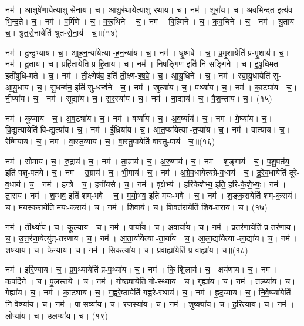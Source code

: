 नम॑। आ॒शुषे॑णा॒येत्या॒शु-से॒ना॒य॒। च॒। आ॒शु॒र॑था॒येत्या॒शु-र॒था॒य॒। च॒। 
नम॑। शूरा॑य। च॒। अ॒व॒भि॒न्द॒त इत्य॑व-भि॒न्द॒ते। च॒। 
नम॑। व॒र्मिणे। च॒। व॒रू॒थिने। च॒। 
नम॑। बि॒ल्मिने। च॒। क॒व॒चिने। च॒। 
नम॑। श्रु॒ताय॑। च॒। श्रु॒त॒से॒नायेति॑ श्रुत-से॒ना॒य॑। च॒॥(१४)


नम॑। दु॒न्दु॒भ्या॑य। च॒। आ॒ह॒न॒न्या॑येत्या-ह॒न॒न्या॑य। च॒। 
नम॑। धृ॒ष्णवे। च॒। प्र॒मृ॒शायेति॑ प्र-मृ॒शाय॑। च॒। 
नम॑। दू॒ताय॑। च॒। प्रहि॑ता॒येति॒ प्र-हि॒ता॒य॒। च॒। 
नम॑। नि॒ष॒ङ्गिण॒ इति॑ नि-स॒ङ्गिने। च॒। इ॒षु॒धि॒मत॒ इती॑षुधि-मते। च॒। 
नम॑। ती॒क्ष्णेष॑व॒ इति॑ ती॒क्ष्ण-इ॒ष॒वे॒। च॒। आ॒यु॒धिने। च॒। 
नम॑। स्वा॒यु॒धायेति॑ सु-आ॒यु॒धाय॑। च॒। सु॒धन्व॑न॒ इति॑ सु-धन्व॑ने। च॒। 
नम॑। स्रुत्या॑य। च॒। पथ्या॑य। च॒। 
नम॑। का॒ट्या॑य। च॒। नी॒प्या॑य। च॒। 
नम॑। सूद्या॑य। च॒। स॒र॒स्या॑य। च॒। 
नम॑। ना॒द्याय॑। च॒। वै॒श॒न्ताय॑। च॒। (१५)


नम॑। कूप्या॑य। च॒। अ॒व॒ट्या॑य। च॒। 
नम॑। वर्ष्या॑य। च॒। अ॒व॒र्ष्याय॑। च॒। 
नम॑। मे॒घ्या॑य। च॒। वि॒द्यु॒त्या॑येति॑ वि-द्यु॒त्या॑य। च॒। 
नम॑। ई॒ध्रिया॑य। च॒। आ॒त॒प्या॑येत्या-त॒प्या॑य। च॒। 
नम॑। वात्या॑य। च॒। रेष्मि॑याय। च॒। 
नम॑। वा॒स्त॒व्या॑य। च॒। वा॒स्तु॒पायेति॑ वास्तु-पाय॑। च॒॥(१६)


नम॑। सोमा॑य। च॒। रु॒द्राय॑। च॒। 
नम॑। ता॒म्राय॑। च॒। अ॒रु॒णाय॑। च॒। 
नम॑। श॒ङ्गाय॑। च॒। प॒शु॒पत॑य॒ इति॑ पशु-पत॑ये। च॒। 
नम॑। उ॒ग्राय॑। च॒। भी॒माय॑। च॒। 
नम॑। अ॒ग्रे॒व॒धायेत्य॑ग्रे-व॒धाय॑। च॒। दू॒रे॒व॒धायेति॑ दूरे-व॒धाय॑। च॒। 
नम॑। ह॒न्त्रे। च॒। हनी॑यसे। च॒। 
नम॑। वृ॒क्षेभ्य॑। हरि॑केशेभ्य॒ इति॒ हरि॑-के॒शे॒भ्यः॒। 
नम॑। ता॒राय॑। नम॑। श॒म्भव॒ इति॑ शम्-भवे। च॒। म॒यो॒भव॒ इति॑ मयः-भवे। च॒। 
नम॑। श॒ङ्क॒रायेति॑ शम्-क॒राय॑। च॒। म॒य॒स्क॒रायेति॑ मयः-क॒राय॑। च॒। 
नम॑। शि॒वाय॑। च॒। शि॒वत॑रा॒येति॑ शि॒व-त॒रा॒य॒। च॒। (१७)


नम॑। तीर्थ्या॑य। च॒। कूल्या॑य। च॒। 
नम॑। पा॒र्या॑य। च॒। अ॒वा॒र्या॑य। च॒। 
नम॑। प्र॒तर॑णा॒येति॑ प्र-तर॑णाय। च॒। उ॒त्त॒र॑णा॒येत्यु॑त्-तर॑णाय। च॒। 
नम॑। आ॒ता॒र्या॑येत्या-ता॒र्या॑य। च॒। आ॒ला॒द्या॑येत्या-ला॒द्या॑य। च॒। 
नम॑। शष्प्या॑य। च॒। फेन्या॑य। च॒। 
नम॑। सि॒क॒त्या॑य। च॒। प्र॒वा॒ह्या॑येति॑ प्र-वा॒ह्या॑य। च॒॥(१८)


नम॑। इ॒रि॒ण्या॑य। च॒। प्र॒प॒थ्या॑येति॑ प्र-प॒थ्या॑य। च॒। 
नम॑। कि॒शि॒लाय॑। च॒। क्षय॑णाय। च॒। 
नम॑। क॒प॒र्दिने। च॒। पु॒ल॒स्तये। च॒। 
नम॑। गोष्ठ्या॒येति॒ गो-स्थ्या॒य॒। च॒। गृह्या॑य। च॒। 
नम॑। तल्प्या॑य। च॒। गेह्या॑य। च॒। 
नम॑। का॒ट्या॑य। च॒। ग॒ह्व॒रे॒ष्ठायेति॑ गह्वरे-स्थाय॑। च॒। 
नम॑। ह्र॒द॒य्या॑य। च॒। नि॒वे॒ष्प्या॑येति॑ नि-वेष्प्या॑य। च॒। 
नम॑। पा॒स॒व्या॑य। च॒। र॒ज॒स्या॑य। च॒। 
नम॑। शुष्क्या॑य। च॒। ह॒रि॒त्या॑य। च॒। 
नम॑। लोप्या॑य। च॒। उ॒ल॒प्या॑य। च॒। (१९)


